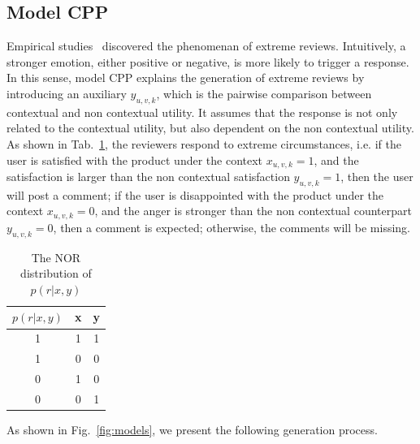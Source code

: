 \documentclass[preprint,12pt]{elsarticle}
\begin{document}
\subsection{Model CPP}
Empirical studies~\cite{Wojnicki2008Word} discovered the phenomenan of extreme reviews. Intuitively, a stronger emotion, either positive or negative, is more likely to trigger a response. In this sense, model CPP explains the generation of extreme reviews by introducing an auxiliary $y_{u,v,k}$, which is the pairwise comparison between contextual and non contextual utility. It assumes that the response is not only related to the contextual utility, but also dependent on the non contextual utility. As shown in Tab.~\ref{tab:CPP}, the reviewers respond to extreme circumstances, i.e. if the user is satisfied with the product under the context $x_{u,v,k}=1$, and the satisfaction is larger than the non contextual satisfaction $y_{u,v,k}=1$, then the user will post a comment;  if the user is disappointed with the product under the context $x_{u,v,k}=0$, and the anger is stronger than the non contextual counterpart $y_{u,v,k}=0$, then a comment is expected; otherwise, the comments will be missing. 
   
\begin{table}
\caption{The NOR distribution of $p(r|x,y)$}\label{tab:CPP}
\centering
\begin{tabular}{|c|c|c|}
\hline\hline
$p(r|x,y)$ & x & y\\\hline
1 & 1 & 1 \\\hline
1 & 0 & 0 \\\hline
0 & 1 & 0 \\\hline
0 & 0 & 1 \\\hline
\hline
\end{tabular}
\end{table}
As shown in Fig.~\ref{fig:models}, we present the following generation process.
\end{document}
